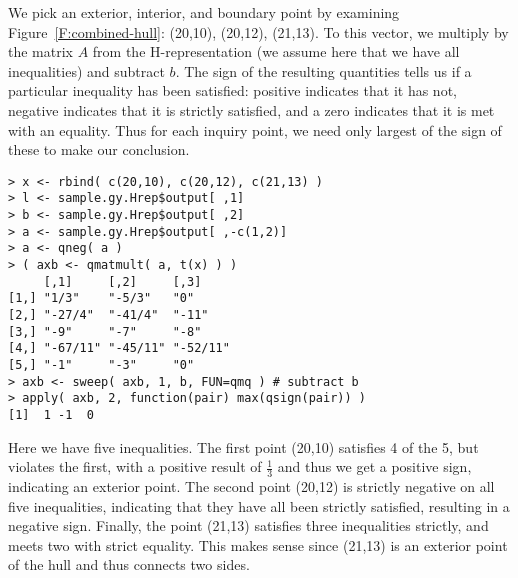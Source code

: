 We pick an exterior, interior, and boundary point by examining 
Figure~\ref{F:combined-hull}: (20,10), (20,12), (21,13).  To this vector, we multiply
 by the matrix $A$ from the H-representation (we assume here that we have 
 all inequalities)
 and subtract $b$.  The sign of the resulting quantities tells us if a 
 particular inequality has been satisfied: positive indicates that it has not, 
 negative indicates that it is strictly satisfied, and a zero indicates that it is
 met with an equality.  Thus for each inquiry point, we need only largest
 of the sign of these to make our conclusion.
\begin{verbatim}
> x <- rbind( c(20,10), c(20,12), c(21,13) )
> l <- sample.gy.Hrep$output[ ,1]
> b <- sample.gy.Hrep$output[ ,2]
> a <- sample.gy.Hrep$output[ ,-c(1,2)]
> a <- qneg( a )
> ( axb <- qmatmult( a, t(x) ) )
     [,1]     [,2]     [,3]    
[1,] "1/3"    "-5/3"   "0"     
[2,] "-27/4"  "-41/4"  "-11"   
[3,] "-9"     "-7"     "-8"    
[4,] "-67/11" "-45/11" "-52/11"
[5,] "-1"     "-3"     "0"     
> axb <- sweep( axb, 1, b, FUN=qmq ) # subtract b
> apply( axb, 2, function(pair) max(qsign(pair)) )
[1]  1 -1  0
\end{verbatim}

Here we have five inequalities.
 The first point (20,10) satisfies 4 of the 5, but violates the first, with
 a positive result of $\frac{1}{3}$ and thus we get a positive sign, indicating
 an exterior point.  The second point (20,12) is strictly negative on all five inequalities, indicating that they have all been strictly satisfied, 
 resulting in a negative sign.  Finally, the point (21,13) satisfies three inequalities strictly, and meets
two with strict equality.  This makes sense since (21,13) is an exterior point
of the hull and thus connects two sides.

